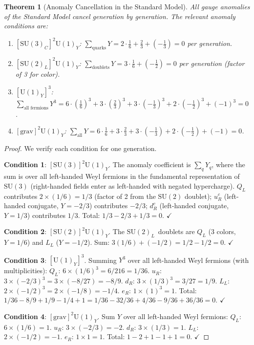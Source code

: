\documentclass[12pt]{article}
\newtheorem{theorem}{Theorem}[section]
\theoremstyle{definition}
\theoremstyle{remark}
\newcommand{\su}[1]{\mathrm{SU}(#1)}
\newcommand{\uu}[1]{\mathrm{U}(#1)}
\begin{document}
\begin{theorem}[Anomaly Cancellation in the Standard Model]
\label{thm:anomaly-cancellation}
All gauge anomalies of the Standard Model cancel generation by generation. The relevant anomaly conditions are:
\begin{enumerate}
\item $[\su{3}_C]^2 \uu{1}_Y$: $\sum_{\text{quarks}} Y = 2 \cdot \frac{1}{6} + \frac{2}{3} + (-\frac{1}{3}) = 0$ per generation.
\item $[\su{2}_L]^2 \uu{1}_Y$: $\sum_{\text{doublets}} Y = 3 \cdot \frac{1}{6} + (-\frac{1}{2}) = 0$ per generation (factor of 3 for color).
\item $[\uu{1}_Y]^3$: $\sum_{\text{all fermions}} Y^3 = 6 \cdot (\frac{1}{6})^3 + 3 \cdot (\frac{2}{3})^3 + 3 \cdot (-\frac{1}{3})^3 + 2 \cdot (-\frac{1}{2})^3 + (-1)^3 = 0$.
\item $[\text{grav}]^2 \uu{1}_Y$: $\sum_{\text{all}} Y = 6 \cdot \frac{1}{6} + 3 \cdot \frac{2}{3} + 3 \cdot (-\frac{1}{3}) + 2 \cdot (-\frac{1}{2}) + (-1) = 0$.
\end{enumerate}
\end{theorem}

\begin{proof}
We verify each condition for one generation.

\textbf{Condition 1}: $[\su{3}]^2\uu{1}_Y$. The anomaly coefficient is $\sum_q Y_q$, where the sum is over all left-handed Weyl fermions in the fundamental representation of $\su{3}$ (right-handed fields enter as left-handed with negated hypercharge). $Q_L$ contributes $2 \times (1/6) = 1/3$ (factor of 2 from the $\su{2}$ doublet); $u_R^c$ (left-handed conjugate, $Y = -2/3$) contributes $-2/3$; $d_R^c$ (left-handed conjugate, $Y = 1/3$) contributes $1/3$. Total: $1/3 - 2/3 + 1/3 = 0$. $\checkmark$

\textbf{Condition 2}: $[\su{2}]^2\uu{1}_Y$. The $\su{2}_L$~doublets are $Q_L$ (3 colors, $Y = 1/6$) and $L_L$ ($Y = -1/2$). Sum: $3(1/6) + (-1/2) = 1/2 - 1/2 = 0$. $\checkmark$

\textbf{Condition 3}: $[\uu{1}_Y]^3$. Summing $Y^3$ over all left-handed Weyl fermions (with multiplicities): $Q_L$: $6 \times (1/6)^3 = 6/216 = 1/36$. $u_R$: $3 \times (-2/3)^3 = 3 \times (-8/27) = -8/9$. $d_R$: $3 \times (1/3)^3 = 3/27 = 1/9$. $L_L$: $2 \times (-1/2)^3 = 2 \times (-1/8) = -1/4$. $e_R$: $1 \times (1)^3 = 1$. Total: $1/36 - 8/9 + 1/9 - 1/4 + 1 = 1/36 - 32/36 + 4/36 - 9/36 + 36/36 = 0$. $\checkmark$

\textbf{Condition 4}: $[\text{grav}]^2\uu{1}_Y$. Sum $Y$ over all left-handed Weyl fermions: $Q_L$: $6 \times (1/6) = 1$. $u_R$: $3 \times (-2/3) = -2$. $d_R$: $3 \times (1/3) = 1$. $L_L$: $2 \times (-1/2) = -1$. $e_R$: $1 \times 1 = 1$. Total: $1 - 2 + 1 - 1 + 1 = 0$. $\checkmark$
\end{proof}
\end{document}
